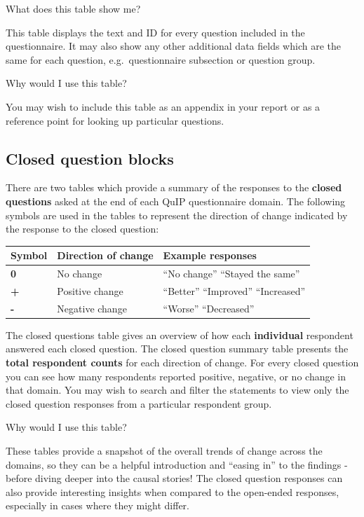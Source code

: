 \documentclass[
]{book}
\begin{document}
What does this table show me?

This table displays the text and ID for every question included in the questionnaire. It may also show any other additional data fields which are the same for each question, e.g.~questionnaire subsection or question group.

Why would I use this table?

You may wish to include this table as an appendix in your report or as a reference point for looking up particular questions.

\hypertarget{closed-question-blocks}{%
\subsection{Closed question blocks}\label{closed-question-blocks}}

There are two tables which provide a summary of the responses to the \textbf{closed questions} asked at the end of each QuIP questionnaire domain. The following symbols are used in the tables to represent the direction of change indicated by the response to the closed question:

\begin{longtable}[]{@{}lll@{}}
\toprule
\textbf{Symbol} & \textbf{Direction of change} & \textbf{Example responses} \\
\midrule
\endhead
\textbf{0} & No change & ``No change'' ``Stayed the same'' \\
\textbf{+} & Positive change & ``Better'' ``Improved'' ``Increased'' \\
\textbf{-} & Negative change & ``Worse'' ``Decreased'' \\
\bottomrule
\end{longtable}

The closed questions table gives an overview of how each \textbf{individual} respondent answered each closed question. The closed question summary table presents the \textbf{total respondent counts} for each direction of change. For every closed question you can see how many respondents reported positive, negative, or no change in that domain. You may wish to search and filter the statements to view only the closed question responses from a particular respondent group.

Why would I use this table?

These tables provide a snapshot of the overall trends of change across the domains, so they can be a helpful introduction and ``easing in'' to the findings - before diving deeper into the causal stories! The closed question responses can also provide interesting insights when compared to the open-ended responses, especially in cases where they might differ.
\end{document}
